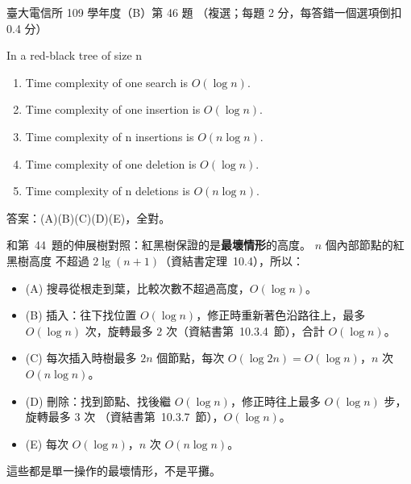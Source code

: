 \begin{pastexam}[label={px:ntu-109-comm-dsa-46}]{臺大電信所 109 學年度（B）第 46 題}
（複選；每題 2 分，每答錯一個選項倒扣 0.4 分）

In a red-black tree of size n
\begin{enumerate}[label=(\Alph*),nosep]
\item Time complexity of one search is $O(\log n)$.
\item Time complexity of one insertion is $O(\log n)$.
\item Time complexity of n insertions is $O(n\log n)$.
\item Time complexity of one deletion is $O(\log n)$.
\item Time complexity of n deletions is $O(n\log n)$.
\end{enumerate}
\end{pastexam}

\begin{pastsoln}
答案：(A)(B)(C)(D)(E)，全對。

和第~44~題的伸展樹對照：紅黑樹保證的是\textbf{最壞情形}的高度。 $n$ 個內部節點的紅黑樹高度
不超過 $2\lg(n + 1)$（資結書定理~10.4），所以：
\begin{itemize}
\item (A) 搜尋從根走到葉，比較次數不超過高度，$O(\log n)$。
\item (B) 插入：往下找位置 $O(\log n)$，修正時重新著色沿路往上，最多 $O(\log n)$ 次，旋轉最多
$2$ 次（資結書第~10.3.4~節），合計 $O(\log n)$。
\item (C) 每次插入時樹最多 $2n$ 個節點，每次 $O(\log 2n) = O(\log n)$，$n$ 次 $O(n\log n)$。
\item (D) 刪除：找到節點、找後繼 $O(\log n)$，修正時往上最多 $O(\log n)$ 步，旋轉最多 $3$ 次
（資結書第~10.3.7~節），$O(\log n)$。
\item (E) 每次 $O(\log n)$，$n$ 次 $O(n\log n)$。
\end{itemize}
這些都是單一操作的最壞情形，不是平攤。
\end{pastsoln}
